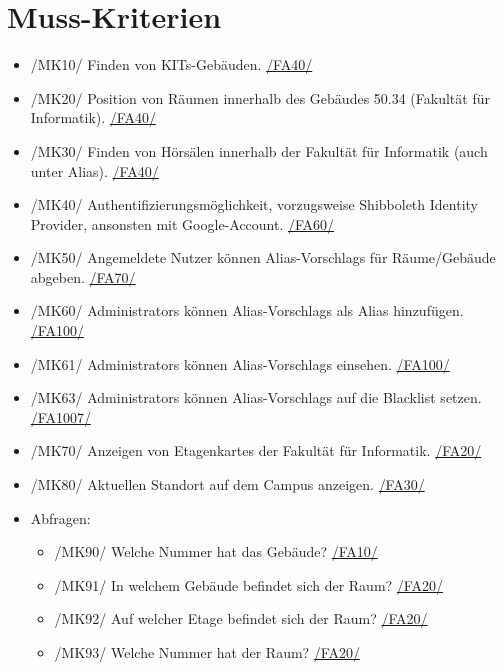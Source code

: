 \section{Muss-Kriterien}

\begin{itemize}

    \item{/MK10/} \label{/MK10/}Finden von \Glspl{KIT}-Gebäuden. \hyperref[/FA40/]{/FA40/}
    \item{/MK20/} \label{/MK20/}Position von Räumen innerhalb des Gebäudes 50.34 (Fakultät für Informatik). \hyperref[/FA40/]{/FA40/}
    \item{/MK30/} \label{/MK30/}Finden von Hörsälen innerhalb der Fakultät für Informatik (auch unter Alias). \hyperref[/FA40/]{/FA40/}
    \item{/MK40/} \label{/MK40/}Authentifizierungsmöglichkeit, vorzugsweise Shibboleth Identity Provider, ansonsten mit Google-Account. \hyperref[/FA60/]{/FA60/}
    \item{/MK50/} \label{/MK50/}Angemeldete Nutzer können \Glspl{Alias-Vorschlag} für Räume/Gebäude abgeben. \hyperref[/FA70/]{/FA70/}
    \item{/MK60/} \label{/MK60/}\Glspl{Administrator} können \Glspl{Alias-Vorschlag} als \Gls{Alias} hinzufügen. \hyperref[/FA100/]{/FA100/}
    \item{/MK61/} \label{/MK61/}\Glspl{Administrator} können \Glspl{Alias-Vorschlag} einsehen. \hyperref[/FA100/]{/FA100/}
    \item{/MK63/} \label{/MK62/}\Glspl{Administrator} können \Glspl{Alias-Vorschlag} auf die \Gls{Blacklist} setzen. \hyperref[/FA100/]{/FA1007/}
    \item{/MK70/} \label{/MK70/}Anzeigen von \Glspl{Etagenkarte} der Fakultät für Informatik. \hyperref[/FA20/]{/FA20/}
    \item{/MK80/} \label{/MK80/}Aktuellen Standort auf dem \Gls{Campus} anzeigen. \hyperref[/FA30/]{/FA30/}
    \item Abfragen:
        \begin{itemize}
            \item{/MK90/} \label{/MK90/}Welche Nummer hat das Gebäude? \hyperref[/FA10/]{/FA10/}
            \item{/MK91/} \label{/MK91/}In welchem Gebäude befindet sich der Raum? \hyperref[/FA20/]{/FA20/}
            \item{/MK92/} \label{/MK92/}Auf welcher Etage befindet sich der Raum? \hyperref[/FA20/]{/FA20/}
            \item{/MK93/} \label{/MK93/}Welche Nummer hat der Raum? \hyperref[/FA20/]{/FA20/}

\end{itemize}
\end{itemize}
